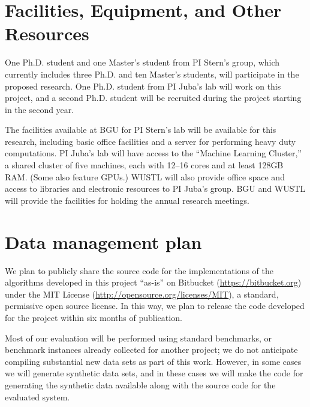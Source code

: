 \documentclass[12pt]{article}
\newcommand{\note}[1]{\textbf{\textit{#1}}}
\begin{document}
\section*{Facilities, Equipment, and Other Resources}

One Ph.D. student and one Master’s student from PI Stern's group, which currently includes three Ph.D. and ten Master's students, will participate in the proposed research. One Ph.D. student from PI Juba's lab will work on this project, and a second Ph.D. student will be recruited during the project starting in the second year.

The facilities available at BGU for PI Stern's
lab will be available for this research, including basic office facilities and a server for performing heavy duty computations. PI Juba's lab will have access to the ``Machine Learning Cluster,'' a  shared cluster of five machines, each with 12--16 cores and at least 128GB RAM. (Some also feature GPUs.) WUSTL will also provide office space and access to libraries and electronic resources to PI Juba's group. BGU and WUSTL will provide the facilities for holding the annual research meetings. 

\newpage
\section*{Data management plan}
We plan to publicly share the source code for the implementations of the algorithms developed in this project ``as-is'' on Bitbucket (\url{https://bitbucket.org}) under the MIT License (\url{http://opensource.org/licenses/MIT}), a standard, permissive open source license. In this way, we plan to release the code developed for the project within six months of publication.

Most of our evaluation will be performed using standard benchmarks, or benchmark instances already collected for another project; we do not anticipate compiling substantial new data sets as part of this work. However, in some cases we will generate synthetic data sets, and in these cases we will make the code for generating the synthetic data available along with the source code for the evaluated system. 
\end{document}
